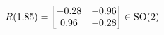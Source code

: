 \documentclass[preview]{standalone}
\begin{document}
\begin{align*}
\special{dvisvgm:raw <g id='unique000'>}R(1.85) = \begin{bmatrix} -0.28 & -0.96 \\ 0.96 & -0.28 \end{bmatrix} \in \text{SO}(2)\special{dvisvgm:raw </g>}
\end{align*}
\end{document}
